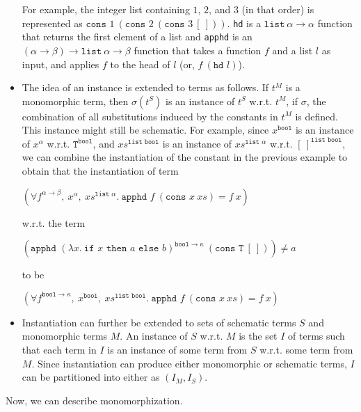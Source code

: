 \documentclass{article}
\begin{document}
\begin{itemize}
			For example, the integer list 
			containing $1$, $2$, and $3$ (in that 
			order) is represented as 
			$\texttt{cons }1\ (\texttt{cons }2
			\ (\texttt{cons }3\ [\ ]))$.
			\texttt{hd} is a $\texttt{list}\ 
			\alpha \to \alpha$ function that 
			returns the first element of a list 
			and \texttt{apphd} is an $(\alpha
			\to \beta) \to \texttt{list}\
			\alpha \to \beta$ function that
			takes a function $f$ and a list 
			$l$ as input, and applies $f$
			to the head of $l$ (or, $f\ 
			(\texttt{hd }l)$).
		\item The idea of an instance is 
			extended to terms as follows. If 
			$t^M$ is a monomorphic term, then 
			$\sigma(t^S)$ is an instance of 
			$t^S$ w.r.t. $t^M$, if 
			$\sigma$, the combination of all 
			substitutions induced by the 
			constants in $t^M$ is defined. This 
			instance might still be schematic. For 
			example, since $x^{\texttt{bool}}$ is 
			an instance of $x^{\alpha}$ w.r.t.
			$\texttt{T}^{\texttt{bool}}$, 
			and $xs^{\texttt{list bool}}$ is 
			an instance of 
			$xs^{\texttt{list }\alpha}$ 
			w.r.t. $[\ ]^{\texttt{list bool}}$,
			we can combine the instantiation 
			of the constant in the previous 
			example to obtain that the 
			instantiation of term
			\begin{center}
				$(\forall f^{\alpha \to \beta},\ 
				x^{\alpha},\ xs^{\texttt{list }
				\alpha}.\ \texttt{apphd }f\ 
				(\texttt{cons }x\ xs) = f\ x)$
			\end{center}
			w.r.t. the term
			\begin{center}
				$(\texttt{apphd }(\lambda 
				x.\ \texttt{if }x\texttt{ then }
				a \texttt{ else } b)^{\texttt{bool} 
				\to \kappa}\ (\texttt{cons T}\ 
				[\ ])) \neq a$
			\end{center}
			to be
			\begin{center}
				$(\forall f^{\texttt{bool}
				\to \kappa},\ x^{\texttt{bool}},
				\ xs^{\texttt{list bool}}.\ 
				\texttt{apphd }f\ (\texttt{cons }x
				\ xs) = f\ x)$
			\end{center}
		\item Instantiation can further be 
			extended to sets of schematic 
			terms $S$ and monomorphic terms $M$. 
			An instance of $S$ w.r.t. 
			$M$ is the set $I$ of terms such 
			that each term in $I$ is an instance 
			of some term from $S$ w.r.t. 
			some term from $M$. Since 
			instantiation can produce either 
			monomorphic or schematic terms, $I$
			can be partitioned into either as
			$(I_M, I_S)$.
		\end{itemize}
		Now, we can describe monomorphization.
\end{document}

